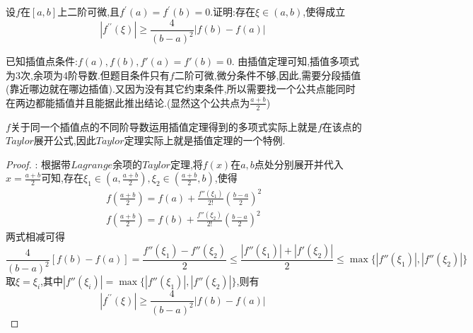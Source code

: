\documentclass[lang=cn,newtx,10pt,scheme=chinese]{../Template/elegantbook}
\begin{document}
\begin{exercise}
    设\(f\)在\([a,b]\)上二阶可微,且\(f^{\prime}(a)=f^{\prime}(b)=0\).证明:存在\(\xi\in(a,b)\),使得成立
    \begin{equation}
        \left| f^{\prime\prime}(\xi ) \right|\geqslant \frac{4}{(b-a)^2}\left| f(b)-f(a) \right|\
        \nonumber
    \end{equation}
    \begin{note}
    已知插值点条件:$f(a),f(b),f'(a)=f'(b)=0$.
    由插值定理可知,插值多项式为3次,余项为4阶导数.但题目条件只有$f$二阶可微,微分条件不够,因此,需要分段插值(靠近哪边就在哪边插值).又因为没有其它约束条件,所以需要找一个公共点能同时在两边都能插值并且能据此推出结论.(显然这个公共点为$\frac{a+b}{2}$)
\end{note}
\begin{remark}
        $f$关于同一个插值点的不同阶导数运用插值定理得到的多项式实际上就是$f$在该点的$Taylor$展开公式,因此$Taylor$定理实际上就是插值定理的一个特例.
\end{remark}
    \begin{proof}
    {\color{blue} }:
    根据带$Lagrange$余项的$Taylor$定理,将$f(x)$在$a,b$点处分别展开并代入$x=\frac{a+b}{2}$可知,存在$\xi_1\in(a,\frac{a+b}{2}),\xi_2\in(\frac{a+b}{2},b)$,使得
    \begin{gather}
    f(\frac{a+b}{2})=f(a)+\frac{f''(\xi_1)}{2!}(\frac{b-a}{2})^2
    \nonumber
    \\
    f(\frac{a+b}{2})=f(b)+\frac{f''(\xi_2)}{2!}(\frac{b-a}{2})^2
    \nonumber
    \end{gather}
    两式相减可得
    \begin{equation}
    \frac{4}{(b-a)^2}[f(b)-f(a)]=\frac{f''(\xi_1)-f''(\xi_2)}{2}\leqslant \frac{|f''(\xi_1)|+|f'(\xi_2)|}{2}\leqslant \max\{|f''(\xi_1)|,|f''(\xi_2)|\}
        \nonumber
    \end{equation}
    取$\xi=\xi_i$,其中$|f''(\xi_i)|= \max\{|f''(\xi_1)|,|f''(\xi_2)|\}$,则有
    \begin{equation}
\left| f^{\prime\prime}(\xi ) \right|\geqslant \frac{4}{(b-a)^2}\left| f(b)-f(a) \right|\
        \nonumber
    \end{equation}
    

\end{proof}
\end{exercise}
\end{document}
